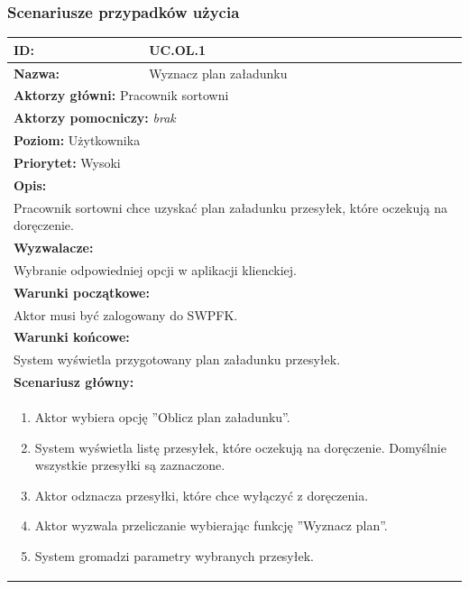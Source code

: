 \subsubsection*{Scenariusze przypadków użycia}
\begin{center}
\begin{longtable}[h]{|p{1.6cm}|p{13.5cm}|}
\hline
\textbf{ID:} & UC.OL.1 \\ \hline
\textbf{Nazwa:} & Wyznacz plan załadunku \\ \hline
\multicolumn{2}{|p{15.1cm}|}{\textbf{Aktorzy główni:} Pracownik sortowni} \\
\multicolumn{2}{|p{15.1cm}|}{\textbf{Aktorzy pomocniczy:} \textit{brak}} \\
\multicolumn{2}{|p{15.1cm}|}{\textbf{Poziom:} Użytkownika} \\
\multicolumn{2}{|p{15.1cm}|}{\textbf{Priorytet:} Wysoki} \\
\hline
\multicolumn{2}{|p{15.1cm}|}{\textbf{Opis:}} \\
\multicolumn{2}{|p{15.1cm}|}{
Pracownik sortowni chce uzyskać plan załadunku przesyłek, które oczekują na doręczenie.
} \\ \hline
\multicolumn{2}{|p{15.1cm}|}{\textbf{Wyzwalacze:}} \\
\multicolumn{2}{|p{15.1cm}|}{
Wybranie odpowiedniej opcji w aplikacji klienckiej.
} \\ \hline
\multicolumn{2}{|p{15.1cm}|}{\textbf{Warunki początkowe:}} \\
\multicolumn{2}{|p{15.1cm}|}{
Aktor musi być zalogowany do SWPFK.
} \\ \hline
\multicolumn{2}{|p{15.1cm}|}{\textbf{Warunki końcowe:}} \\
\multicolumn{2}{|p{15.1cm}|}{
System wyświetla przygotowany plan załadunku przesyłek.
} \\ \hline
\multicolumn{2}{|p{15.1cm}|}{\textbf{Scenariusz główny:}} \\
\multicolumn{2}{|p{15.1cm}|}{
\begin{enumerate}
\item Aktor wybiera opcję ''Oblicz plan załadunku''.
\item System wyświetla listę przesyłek, które oczekują na doręczenie. Domyślnie wszystkie przesyłki są zaznaczone.
\item Aktor odznacza przesyłki, które chce wyłączyć z doręczenia.
\item Aktor wyzwala przeliczanie wybierając funkcję ''Wyznacz plan''.
\item System gromadzi parametry wybranych przesyłek.

\end{enumerate}}
\end{longtable}
\end{center}
